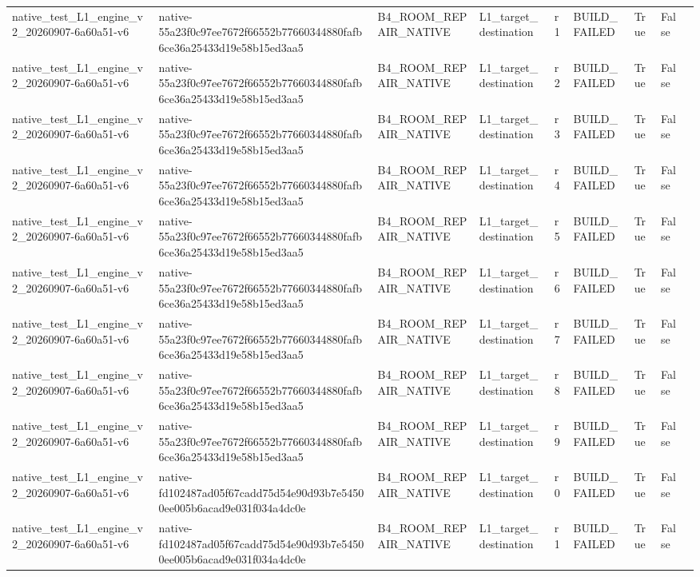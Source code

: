 \begin{tabular}{lllllllll}
native\_test\_L1\_engine\_v2\_20260907-6a60a51-v6 & native-55a23f0c97ee7672f66552b77660344880fafb6ce36a25433d19e58b15ed3aa5 & B4\_ROOM\_REPAIR\_NATIVE & L1\_target\_destination & r1 & BUILD\_FAILED & True & False &  \\
native\_test\_L1\_engine\_v2\_20260907-6a60a51-v6 & native-55a23f0c97ee7672f66552b77660344880fafb6ce36a25433d19e58b15ed3aa5 & B4\_ROOM\_REPAIR\_NATIVE & L1\_target\_destination & r2 & BUILD\_FAILED & True & False &  \\
native\_test\_L1\_engine\_v2\_20260907-6a60a51-v6 & native-55a23f0c97ee7672f66552b77660344880fafb6ce36a25433d19e58b15ed3aa5 & B4\_ROOM\_REPAIR\_NATIVE & L1\_target\_destination & r3 & BUILD\_FAILED & True & False &  \\
native\_test\_L1\_engine\_v2\_20260907-6a60a51-v6 & native-55a23f0c97ee7672f66552b77660344880fafb6ce36a25433d19e58b15ed3aa5 & B4\_ROOM\_REPAIR\_NATIVE & L1\_target\_destination & r4 & BUILD\_FAILED & True & False &  \\
native\_test\_L1\_engine\_v2\_20260907-6a60a51-v6 & native-55a23f0c97ee7672f66552b77660344880fafb6ce36a25433d19e58b15ed3aa5 & B4\_ROOM\_REPAIR\_NATIVE & L1\_target\_destination & r5 & BUILD\_FAILED & True & False &  \\
native\_test\_L1\_engine\_v2\_20260907-6a60a51-v6 & native-55a23f0c97ee7672f66552b77660344880fafb6ce36a25433d19e58b15ed3aa5 & B4\_ROOM\_REPAIR\_NATIVE & L1\_target\_destination & r6 & BUILD\_FAILED & True & False &  \\
native\_test\_L1\_engine\_v2\_20260907-6a60a51-v6 & native-55a23f0c97ee7672f66552b77660344880fafb6ce36a25433d19e58b15ed3aa5 & B4\_ROOM\_REPAIR\_NATIVE & L1\_target\_destination & r7 & BUILD\_FAILED & True & False &  \\
native\_test\_L1\_engine\_v2\_20260907-6a60a51-v6 & native-55a23f0c97ee7672f66552b77660344880fafb6ce36a25433d19e58b15ed3aa5 & B4\_ROOM\_REPAIR\_NATIVE & L1\_target\_destination & r8 & BUILD\_FAILED & True & False &  \\
native\_test\_L1\_engine\_v2\_20260907-6a60a51-v6 & native-55a23f0c97ee7672f66552b77660344880fafb6ce36a25433d19e58b15ed3aa5 & B4\_ROOM\_REPAIR\_NATIVE & L1\_target\_destination & r9 & BUILD\_FAILED & True & False &  \\
native\_test\_L1\_engine\_v2\_20260907-6a60a51-v6 & native-fd102487ad05f67cadd75d54e90d93b7e54500ee005b6acad9e031f034a4dc0e & B4\_ROOM\_REPAIR\_NATIVE & L1\_target\_destination & r0 & BUILD\_FAILED & True & False &  \\
native\_test\_L1\_engine\_v2\_20260907-6a60a51-v6 & native-fd102487ad05f67cadd75d54e90d93b7e54500ee005b6acad9e031f034a4dc0e & B4\_ROOM\_REPAIR\_NATIVE & L1\_target\_destination & r1 & BUILD\_FAILED & True & False &  \\

\end{tabular}
